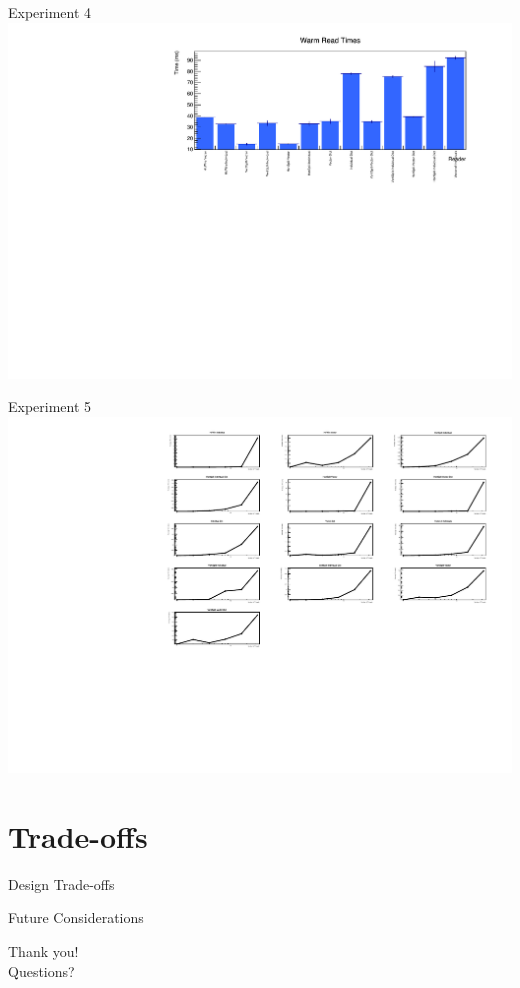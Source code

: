 \documentclass[aspectratio=169]{beamer}
\begin{document}
\begin{frame}{Experiment 4}
\centering
\includegraphics[width=0.9\linewidth]{../experiments/warm_times.pdf}
\end{frame}

\begin{frame}{Experiment 5}
\centering
\includegraphics[width=0.9\linewidth]{../experiments/scaling_plot.pdf}
\end{frame}

\section{Trade-offs}
\begin{frame}{Design Trade-offs}
\end{frame}

\begin{frame}{Future Considerations}
\end{frame}

\begin{frame}[standout]
Thank you! \\
Questions?
\end{frame}
\end{document}
